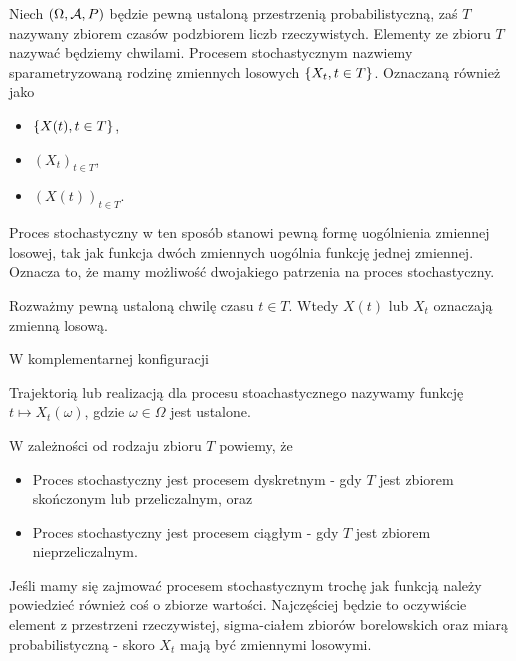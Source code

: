 \documentclass[10pt,a4paper]{book}
\begin{document}
\begin{definition}
Niech $(\Omega, \mathcal{A}, P)$ będzie pewną ustaloną przestrzenią probabilistyczną, zaś $T$ nazywany zbiorem czasów podzbiorem liczb rzeczywistych. Elementy ze zbioru $T$ nazywać będziemy chwilami. 
Procesem stochastycznym nazwiemy sparametryzowaną rodzinę zmiennych losowych $\left\lbrace {{X_t}, {t \in T}} \right\rbrace$. Oznaczaną również jako 
\begin{itemize}
\item $\left\lbrace {X(t), t \in T} \right\rbrace$,
\item $(X_t)_{t \in T}$,
\item $(X(t))_{t \in T}$.
\end{itemize}
\end{definition}

Proces stochastyczny w ten sposób stanowi pewną formę uogólnienia zmiennej losowej, tak jak funkcja dwóch zmiennych uogólnia funkcję jednej zmiennej.
Oznacza to, że mamy możliwość dwojakiego patrzenia na proces stochastyczny.

\begin{remark*}
Rozważmy pewną ustaloną chwilę czasu $t \in T$. Wtedy $X(t)$ lub $X_t$ oznaczają zmienną losową. 
\end{remark*}

W komplementarnej konfiguracji

\begin{definition}
Trajektorią lub realizacją dla procesu stoachastycznego nazywamy funkcję $t \mapsto X_t(\omega)$, gdzie $\omega \in \Omega$ jest ustalone.
\end{definition}

\begin{definition}
W zależności od rodzaju zbioru $T$ powiemy, że
\begin{itemize}
\item Proces stochastyczny jest procesem dyskretnym - gdy $T$ jest zbiorem skończonym lub przeliczalnym, oraz
\item Proces stochastyczny jest procesem ciągłym - gdy $T$ jest zbiorem nieprzeliczalnym.
\end{itemize}
\end{definition}

Jeśli mamy się zajmować procesem stochastycznym trochę jak funkcją należy powiedzieć również coś o zbiorze wartości. Najczęściej będzie to oczywiście element z przestrzeni rzeczywistej, sigma-ciałem zbiorów borelowskich oraz miarą probabilistyczną - skoro $X_t$ mają być zmiennymi losowymi.
\end{document}
